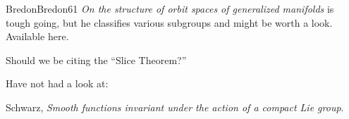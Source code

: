 \begin{description}
Bredon{Bredon61} \emph{On the structure of orbit spaces of generalized
manifolds} is tough going, but he classifies various subgroups and might
be worth a look. Available
{here}.


Should we be citing the ``Slice Theorem?''

Have not had a look at:

Schwarz,
\emph{Smooth functions invariant under the action of a compact {Lie} group}.



\end{description}



\renewcommand{\ssp}{a}
